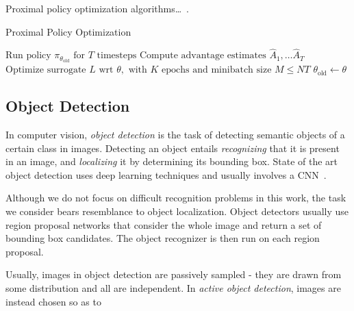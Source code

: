 Proximal policy optimization algorithms\dots~\cite{schulman_ppo_2017}.

\begin{algorithm}
    \caption{Proximal Policy Optimization}
    \begin{algorithmic}
                \State \(\text{Run policy } \pi_{\theta_\text{old}} \text{ for } T \text{ timesteps}\)
                \State \(\text{Compute advantage estimates } \hat{A}_1, \dots \hat{A}_T\)
            \EndFor
            \State \(\text{Optimize surrogate } L \text{ wrt } \theta, \text{ with } K \text{ epochs and minibatch size } M \leq NT\)
            \State \(\theta_{\text{old}} \leftarrow \theta\)
        \EndFor
    \end{algorithmic}
\end{algorithm}

\subsection{Object Detection}


In computer vision, \textit{object detection} is the task of detecting semantic objects of a certain class in images.
Detecting an object entails \textit{recognizing} that it is present in an image, and \textit{localizing} it by determining its bounding box.
State of the art object detection uses deep learning techniques and usually involves a CNN~\cite{zhao_objectdetection_2019}.

Although we do not focus on difficult recognition problems in this work, the task we consider bears resemblance to object localization.
Object detectors usually use region proposal networks that consider the whole image and return a set of bounding box candidates.
The object recognizer is then run on each region proposal.


Usually, images in object detection are passively sampled - they are drawn from some distribution and all are independent.
In \textit{active object detection}, images are instead chosen so as to 


